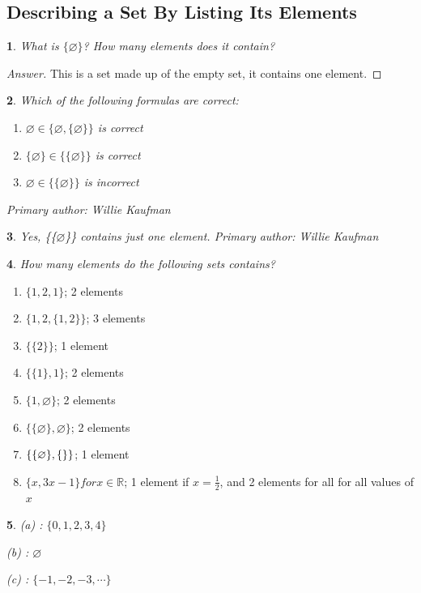 \documentclass{book}
\renewcommand{\emptyset}{\varnothing}
\newtheorem{minorEx}{}[section]
\newcommand{\RR}{\mathbb{R}}
\begin{document}
			\subsection{Describing a Set By Listing Its Elements}%
				\begin{minorEx}%
					What is $ \{\emptyset\} $? How many elements does it contain?
				\end{minorEx}
				\begin{proof}[Answer]
					This is a set made up of the empty set, it contains one element.
				\end{proof}
				\begin{minorEx}%
                Which of the following formulas are correct:
				\begin{enumerate}
                \item $\emptyset \in \{\emptyset, \{\emptyset\}\}$ is correct
                \item $\{\emptyset\} \in \{\{\emptyset\}\}$ is correct
                \item $\emptyset \in \{\{\emptyset\}\}$ is incorrect
                \end{enumerate}
                Primary author: Willie Kaufman
				\end{minorEx}
				\begin{minorEx}%
					Yes, \{\{$\emptyset$\}\} contains just one element. \newline
                    Primary author: Willie Kaufman
				\end{minorEx}
				\begin{minorEx}%
					How many elements do the following sets contains?
				\end{minorEx}
                \begin{enumerate}
					\item $\{1,2,1 \}$; 2 elements
					\item $\{ 1,2,\{1,2\} \}$; 3 elements
					\item $\{\{ 2 \} \}$; 1 element
					\item $\{ \{1 \}, 1\}$; 2 elements
					\item $\{ 1, \emptyset \}$; 2 elements
					\item $\{ \{ \emptyset \}, \emptyset \}$; 2 elements
					\item $\{ \{ \emptyset\}, \{\null\} \}$; 1 element
					\item $\{x, 3x-1 \} for x\in \RR$; 1 element if $x = \frac{1}{2}$, and 2 elements for all for all values of $x$
                \end{enumerate}
                \begin{minorEx}
                (a) : $\{0, 1, 2, 3, 4\}$
                
                (b) : $\emptyset$
                
                (c) : $\{-1, -2, -3, \cdots\}$
                \end{minorEx}
\end{document}
